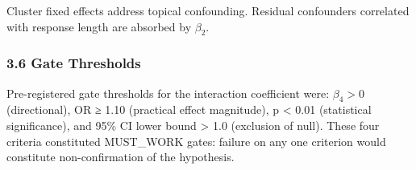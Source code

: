 Cluster fixed effects address topical confounding. Residual confounders correlated with response length are absorbed by $\beta_2$.

\subsubsection{3.6 Gate Thresholds}

Pre-registered gate thresholds for the interaction coefficient were: $\beta_4 > 0$ (directional), OR ≥ 1.10 (practical effect magnitude), p < 0.01 (statistical significance), and 95\% CI lower bound > 1.0 (exclusion of null). These four criteria constituted MUST_WORK gates: failure on any one criterion would constitute non-confirmation of the hypothesis.

